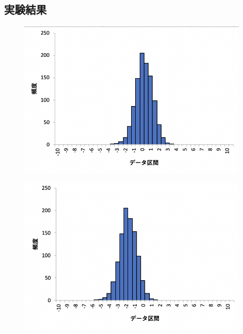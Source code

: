 \documentclass[12pt]{jarticle}
\begin{document}
\subsection{実験結果}
\begin{figure}[h]
    \begin{center}
        \includegraphics[scale=0.7]{kadai4_3graph1.png}
    \end{center}
    \caption{}
\end{figure}
\begin{figure}[h]
    \begin{center}
        \includegraphics[scale=0.7]{kadai4_3graph2.png}
    \end{center}
    \caption{}
\end{figure}
\end{document}

